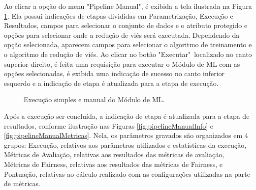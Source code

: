 \documentclass[Portugues,Final]{ic-tese-v3}
\begin{document}
Ao clicar a opção do menu "Pipeline Manual", é exibida a tela ilustrada na Figura \ref{fig:pipelineManual}. Ela possui indicações de etapas divididas em Parametrização, Execução e Resultados, campos para selecionar o conjunto de dados e o atributo protegido e opções para selecionar onde a redução de viés será executada. Dependendo da opção selecionada, aparecem campos para selecionar o algoritmo de treinamento e o algoritmo de redução de viés. Ao clicar no botão "Executar"~localizado no canto superior direito, é feita uma requisição para executar o Módulo de ML com as opções selecionadas, é exibida uma indicação de sucesso no canto inferior esquerdo e a indicação de etapa é atualizada para a etapa de execução.

\begin{figure}[H]
    \centering
    \caption{Execução simples e manual do Módulo de ML.}
    \label{fig:pipelineManual}
\end{figure}

Após a execução ser concluída,  a indicação de etapa é atualizada para a etapa de resultados, conforme ilustração nas Figuras \ref{fig:pipelineManualInfo} e \ref{fig:pipelineManualMetricas}. Nela, os parâmetros gravados são organizados em 4 grupos: Execução, relativos aos parâmetros utilizados e estatísticas da execução, Métricas de Avaliação, relativas aos resultados das métricas de avaliação, Métricas de Fairness, relativas aos resultados das métricas de Fairness, e Pontuação, relativas ao cálculo realizado com as configurações utilizadas na parte de métricas.
\end{document}
